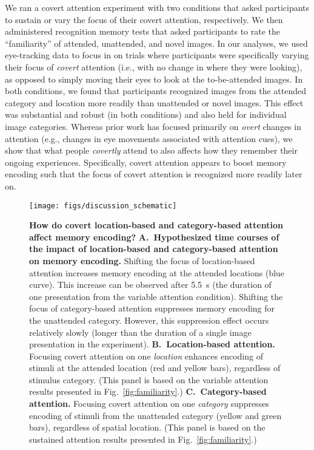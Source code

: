 \documentclass[english]{article}
\begin{document}
We ran a covert attention experiment with two conditions that asked
participants to sustain or vary the focus of their covert attention,
respectively. We then administered recognition memory tests that asked
participants to rate the ``familiarity'' of attended, unattended, and novel
images. In our analyses, we used eye-tracking data to focus in on trials where
participants were specifically varying their focus of \textit{covert} attention
(i.e., with no change in where they were looking), as opposed to simply moving
their eyes to look at the to-be-attended images. In both conditions, we found
that participants recognized images from the attended category and location
more readily than unattended or novel images. This effect was substantial and
robust (in both conditions) and also held for individual image categories.
Whereas prior work has focused primarily on \textit{overt} changes in attention
(e.g., changes in eye movements associated with attention cues), we show that
what people \textit{covertly} attend to also affects how they remember their
ongoing experiences. Specifically, covert attention appears to boost memory
encoding such that the focus of covert attention is recognized more readily
later on.

\begin{figure*}[tp]
  \centering \texttt{[image: figs/discussion\_schematic]}

  \caption{\textbf{How do covert location-based and category-based attention
  affect memory encoding?} \textbf{A.~Hypothesized time courses of the impact of
  location-based and category-based attention on memory encoding.} Shifting the
  focus of location-based attention increases memory encoding at the attended
  locations (blue curve). This increase can be observed after 5.5~s (the
  duration of one presentation from the variable attention condition). Shifting
  the focus of category-based attention suppresses memory encoding for the
  unattended category. However, this suppression effect occurs relatively
  slowly (longer than the duration of a single image presentation in the
  experiment). \textbf{B.~Location-based attention.} Focusing covert attention
  on one \textit{location} enhances encoding of stimuli at the attended
  location (red and yellow bars), regardless of stimulus category. (This panel
  is based on the variable attention results presented in
  Fig.~\ref{fig:familiarity}.) \textbf{C.~Category-based attention.} Focusing
  covert attention on one \textit{category} suppresses encoding of stimuli from
  the unattended category (yellow and green bars), regardless of spatial
  location. (This panel is based on the sustained attention results presented
  in Fig.~\ref{fig:familiarity}.)}

\label{fig:discussion}
\end{figure*}
\end{document}
